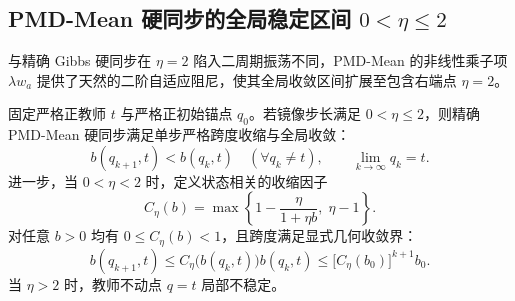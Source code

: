 \documentclass[lang=cn,scheme=chinese,openany]{elegantbook}
\begin{document}
\subsection{PMD-Mean 硬同步的全局稳定区间 \texorpdfstring{$0<\eta\le 2$}{0 < eta <= 2}}
\label{dyn:sec:mean-hard-sync-stability}

与精确 Gibbs 硬同步在 $\eta=2$ 陷入二周期振荡不同，PMD-Mean 的非线性乘子项 $\lambda w_a$ 提供了天然的二阶自适应阻尼，使其全局收敛区间扩展至包含右端点 $\eta=2$。

\begin{theorem}
\label{dyn:thm:mean-hard-sync-full-stability}
固定严格正教师 $t$ 与严格正初始锚点 $q_0$。若镜像步长满足 $0<\eta\le 2$，则精确 PMD-Mean 硬同步满足单步严格跨度收缩与全局收敛：
\begin{equation*}
 b(q_{k+1},t)<b(q_k,t)
 \quad(\forall q_k\ne t),
 \qquad \lim_{k\to\infty}q_k= t.
\end{equation*}
进一步，当 $0<\eta<2$ 时，定义状态相关的收缩因子
\begin{equation}
 C_\eta(b)=\max\left\{1-\frac{\eta}{1+\eta b},\;\eta-1\right\}.
 \label{dyn:eq:mean-hard-sync-contraction-factor}
\end{equation}
对任意 $b>0$ 均有 $0\le C_\eta(b)<1$，且跨度满足显式几何收敛界：
\begin{equation}
 b(q_{k+1},t)\le C_\eta\bigl(b(q_k,t)\bigr)b(q_k,t)
 \le \bigl[C_\eta(b_0)\bigr]^{k+1}b_0.
 \label{dyn:eq:mean-hard-sync-stability-geometric}
\end{equation}
当 $\eta>2$ 时，教师不动点 $q=t$ 局部不稳定。
\end{theorem}
\end{document}
